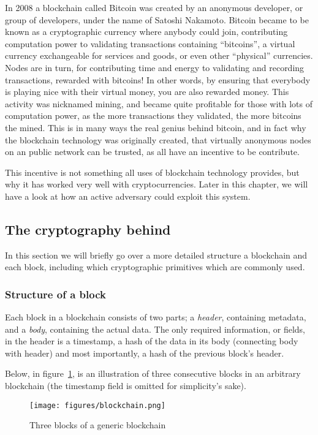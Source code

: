 In 2008 a blockchain called Bitcoin was created by an anonymous
developer, or group of developers, under the name of Satoshi Nakamoto.
Bitcoin became to be known as a cryptographic currency where anybody
could join, contributing computation power to validating transactions
containing ``bitcoins'', a virtual currency exchangeable for services
and goods, or even other ``physical'' currencies. Nodes are in turn,
for contributing time and energy to validating and recording
transactions, rewarded with bitcoins! In other words, by ensuring that
everybody is playing nice with their virtual money, you are also
rewarded money. This activity was nicknamed mining, and became quite
profitable for those with lots of computation power, as the more
transactions they validated, the more bitcoins the mined. This is in
many ways the real genius behind bitcoin, and in fact why the
blockchain technology was originally created, that virtually anonymous
nodes on an public network can be trusted, as all have an incentive to
be contribute.

This incentive is not something all uses of blockchain technology
provides, but why it has worked very well with cryptocurrencies. Later
in this chapter, we will have a look at how an active adversary could
exploit this system.


\subsection{The cryptography behind}
In this section we will briefly go over a more detailed structure a
blockchain and each block, including which cryptographic primitives
which are commonly used.

\subsubsection{Structure of a block}
Each block in a blockchain consists of two parts; a \textit{header},
containing metadata, and a \textit{body}, containing the actual data.
The only required information, or fields, in the header is a
timestamp, a hash of the data in its body (connecting body with
header) and most importantly, a hash of the previous block's header.

Below, in figure~\ref{fig:blockchain}, is an illustration of three
consecutive blocks in an arbitrary blockchain (the timestamp field is
omitted for simplicity's sake).
\begin{figure}[H]
  \centering
  \texttt{[image: figures/blockchain.png]}
  \caption{\label{fig:blockchain} Three blocks of a generic blockchain}
\end{figure}

